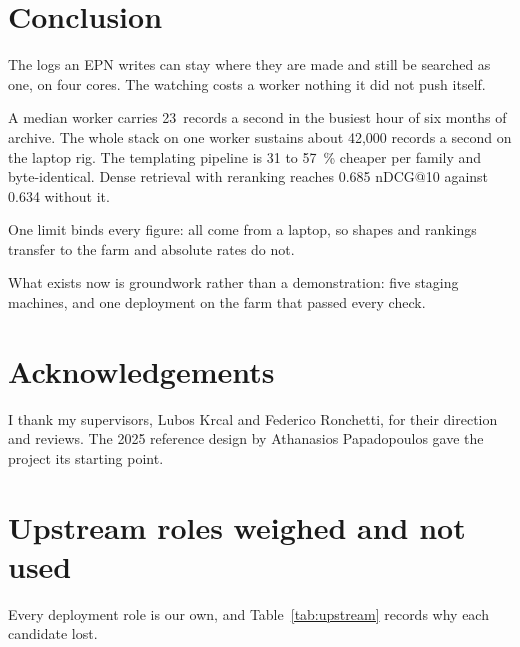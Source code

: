 \section{Conclusion}\label{sec:conclusion}

The logs an EPN writes can stay where they are made and still be searched as one, on four cores. The watching costs a worker nothing it did not push itself.

A median worker carries 23~records a second in the busiest hour of six months of archive. The whole stack on one worker sustains about 42,000 records a second on the laptop rig. The templating pipeline is 31 to 57~\% cheaper per family and byte-identical. Dense retrieval with reranking reaches 0.685 nDCG@10 against 0.634 without it.

One limit binds every figure: all come from a laptop, so shapes and rankings transfer to the farm and absolute rates do not.

What exists now is groundwork rather than a demonstration: five staging machines, and one deployment on the farm that passed every check.

\section*{Acknowledgements}

I thank my supervisors, Lubos Krcal and Federico Ronchetti, for their direction and reviews. The 2025 reference design by Athanasios Papadopoulos \cite{ref:papadopoulos2025} gave the project its starting point.

\appendix

\section{Upstream roles weighed and not used}\label{app:upstream}

Every deployment role is our own, and Table~\ref{tab:upstream} records why each candidate lost.

